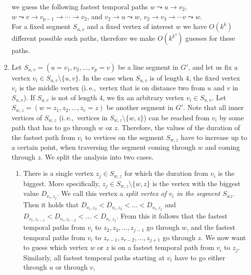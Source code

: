 \documentclass[11pt,a4paper]{article}
\theoremstyle{remark}
\theoremstyle{definition}
\newcommand{\ie}{i.\,e.,\ }
\begin{document}
\begin{enumerate}[G-1.]
    we guess the following fastest temporal paths
    $w \leadsto u \rightarrow v_2$, $w \leadsto v \rightarrow v_{p-1} \rightarrow \cdots \rightarrow v_2$,
    and
    $v_2 \rightarrow u \leadsto w$, $v_2 \rightarrow v_3 \rightarrow \cdots v \leadsto w$.
    \\
    For a fixed segment $S_{u,v}$ and a fixed vertex of interest $w$ we have $O(k^k)$ different possible such paths, therefore we make $O(k^{k^4})$ guesses for these paths.
    \item \label{FPT:guess-splitFromAnotherSegmentAndPaths}
    Let $S_{u,v} = (u=v_1,v_2, \dots, v_p = v)$ be a line segment in $G'$, and let us
    fix a vertex $v_i \in S_{u,v} \setminus \{u,v\}$.
    In the case when $S_{u,v}$ is of length $4$, the fixed vertex $v_i$ is the middle vertex (\ie vertex that is on distance two from $u$ and $v$ in $S_{u,v}$).
    If $S_{u,v}$ is not of length $4$, we fix an arbitrary vertex $v_i \in S_{u,v}$.
    Let 
    $S_{w,z} = (w=z_1,z_2, \dots, z_r = z)$ be another segment in $G'$.
    Note that all inner vertices of $S_{w,z}$ (\ie vertices in $S_{w,z} \setminus \{w,z\}$)
    can be reached from $v_i$ by some path that has to go through $w$ oz $z$.
    Therefore, the values of the duration of the fastest path from $v_i$ to vertices on 
    the segment
    $S_{w,z}$ have to increase up to a certain point, when traversing the segment coming through $w$ and coming through $z$.
    We split the analysis into two cases.
    \begin{enumerate}
        \item 
    There is a single vertex $z_j \in S_{w,z}$ for which the duration from $v_i$ is the biggest.
    More specifically, $z_j \in S_{w,z} \setminus \{w,z\}$ is the vertex with the biggest value  $D_{v_i,z_j}$.
    We call this vertex a \emph{split vertex of $v_i$ in the segment $S_{wz}$}.
    Then it holds that $D_{v_i,z_2} < D_{v_i,z_3} < \dots < D_{v_i,z_j}$ and 
    $D_{v_i,z_{r-1}} < D_{v_i,z_{r-2}} < \dots < D_{v_i,z_j}$.
    From this it follows that the fastest temporal paths from $v_i$ to $z_2, z_3, \dots, z_{j-1}$ go through $w$,
    and 
    the fastest temporal paths from $v_i$ to $z_{r-1}, z_{r-2}, \dots, z_{j+1}$ go through $z$.
    We now want to guess which vertex $w$ or $z$ is on a fastest temporal path from $v_i$ to $z_j$.
    Similarly,
    all fastest temporal paths starting at $v_i$ have to go either through $u$ or through $v$,

\end{enumerate}
\end{enumerate}
\end{document}

